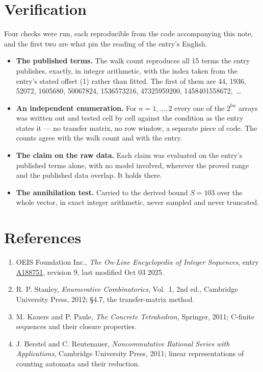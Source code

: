 \documentclass[11pt]{article}
\theoremstyle{definition}
\begin{document}
\section{Verification}

Four checks were run, each reproducible from the code accompanying this note, and the first two are what pin the reading of the entry's English.

\begin{itemize}

\item {\bfseries The published terms.} The walk count reproduces all 15 terms the entry publishes, exactly, in integer arithmetic, with the index taken from the entry's stated offset (1) rather than fitted. The first of them are 44, 1936, 52072, 1605680, 50067824, 1536573216, 47325959200, 1458401558672,~\dots

\item {\bfseries An independent enumeration.} For $n = 1,\dots,2$ every one of the $2^{6n}$ arrays was written out and tested cell by cell against the condition as the entry states it --- no transfer matrix, no row window, a separate piece of code. The counts agree with the walk count and with the entry.

\item {\bfseries The claim on the raw data.} Each claim was evaluated on the entry's published terms alone, with no model involved, wherever the proved range and the published data overlap. It holds there.

\item {\bfseries The annihilation test.} Carried to the derived bound $S = 103$ over the whole vector, in exact integer arithmetic, never sampled and never truncated.

\end{itemize}

\section{References}

\begin{enumerate}

\item OEIS Foundation Inc., \emph{The On-Line Encyclopedia of Integer Sequences}, entry \href{https://oeis.org/A188751}{A188751}, revision 9, last modified Oct 03 2025.

\item R. P. Stanley, \emph{Enumerative Combinatorics}, Vol.~1, 2nd ed., Cambridge University Press, 2012; \S4.7, the transfer-matrix method.

\item M. Kauers and P. Paule, \emph{The Concrete Tetrahedron}, Springer, 2011; C-finite sequences and their closure properties.

\item J. Berstel and C. Reutenauer, \emph{Noncommutative Rational Series with Applications}, Cambridge University Press, 2011; linear representations of counting automata and their reduction.

\end{enumerate}
\end{document}
